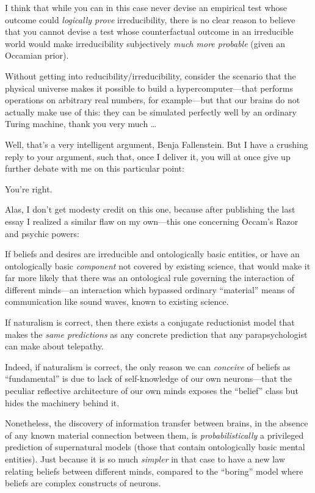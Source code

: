 {
 I think that while you can in this case never devise an empirical
test whose outcome could \textit{logically prove} irreducibility, there
is no clear reason to believe that you cannot devise a test whose
counterfactual outcome in an irreducible world would make
irreducibility subjectively \textit{much more probable} (given an
Occamian prior).}

{
 Without getting into reducibility/irreducibility, consider the
scenario that the physical universe makes it possible to build a
hypercomputer---that performs operations on arbitrary real numbers, for
example---but that our brains do not actually make use of this: they
can be simulated perfectly well by an ordinary Turing machine, thank
you very much \ldots}

{
 Well, that's a very intelligent argument, Benja
Fallenstein. But I have a crushing reply to your argument, such that,
once I deliver it, you will at once give up further debate with me on
this particular point:}

{
 You're right.}

{
 Alas, I don't get modesty credit on this one,
because after publishing the last essay I realized a similar flaw on my
own---this one concerning Occam's Razor and psychic
powers:}

{
 If beliefs and desires are irreducible and ontologically basic
entities, or have an ontologically basic \textit{component} not covered
by existing science, that would make it far more likely that there was
an ontological rule governing the interaction of different minds---an
interaction which bypassed ordinary
``material'' means of communication
like sound waves, known to existing science.}

{
 If naturalism is correct, then there exists a conjugate
reductionist model that makes the \textit{same predictions} as any
concrete prediction that any parapsychologist can make about
telepathy.}

{
 Indeed, if naturalism is correct, the only reason we can
\textit{conceive} of beliefs as
``fundamental'' is due to lack of
self-knowledge of our own neurons---that the peculiar reflective
architecture of our own minds exposes the
``belief'' class but hides the
machinery behind it.}

{
 Nonetheless, the discovery of information transfer between brains,
in the absence of any known material connection between them, is
\textit{probabilistically} a privileged prediction of supernatural
models (those that contain ontologically basic mental entities). Just
because it is so much \textit{simpler} in that case to have a new law
relating beliefs between different minds, compared to the
``boring'' model where beliefs are
complex constructs of neurons.}

